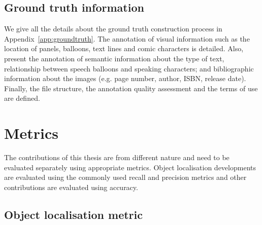 
\subsection{Ground truth information} %
\label{sub:ground_truth}

We give all the details about the ground truth construction process in Appendix~\ref{app:groundtruth}.
The annotation of visual information such as the location of panels, balloons, text lines and comic characters is detailed.
Also, present the annotation of semantic information about the type of text, relationship between speech balloons and speaking characters; and bibliographic information about the images (e.g. page number, author, ISBN, release date).
Finally, the file structure, the annotation quality assessment and the terms of use are defined.






\section{Metrics} %
\label{sec:ex:metrics}
The contributions of this thesis are from different nature and need to be evaluated separately using appropriate metrics.
Object localisation developments are evaluated using the commonly used recall and precision metrics and other contributions are evaluated using accuracy.

\subsection{Object localisation metric} %
\label{sub:ex:object_localisation_metric}


